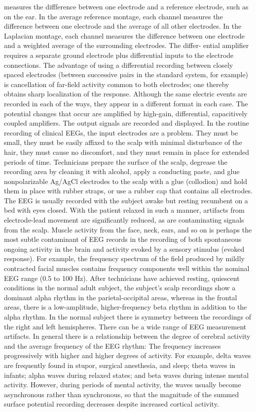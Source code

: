 measures the diffference between one electrode and a reference electrode,
such as on the ear. In the average reference montage, each channel measures
the difference between one electrode and the average of all other electrodes.
In the Laplacian montage, each channel measures the difference between one
electrode and a weighted average of the surrounding electrodes. The differ-
ential amplifier requires a separate ground electrode plus differential inputs to
the electrode connections. The advantage of using a differential recording
between closely spaced electrodes (between successive pairs in the standard
system, for example) is cancellation of far-field activity common to both
electrodes; one thereby obtains sharp localization of the response. Although
the same electric events are recorded in each of the ways, they appear in a
different format in each case. The potential changes that occur are amplified by
high-gain, differential, capacitively coupled amplifiers. The output signals are
recorded and displayed.
In the routine recording of clinical EEGs, the input electrodes are a
problem. They must be small, they must be easily affixed to the scalp with
minimal disturbance of the hair, they must cause no discomfort, and they must
remain in place for extended periods of time. Technicians prepare the surface
of the scalp, degrease the recording area by cleaning it with alcohol, apply a
conducting paste, and glue nonpolarizable Ag/AgCl electrodes to the scalp
with a glue (collodion) and hold them in place with rubber straps, or use a
rubber cap that contains all electrodes.
The EEG is usually recorded with the subject awake but resting recumbent
on a bed with eyes closed. With the patient relaxed in such a manner, artifacts
from electrode-lead movement are significantly reduced, as are contaminating
signals from the scalp. Muscle activity from the face, neck, ears, and so on is
perhaps the most subtle contaminant of EEG records in the recording of both
spontaneous ongoing activity in the brain and activity evoked by a sensory
stimulus (evoked response). For example, the frequency spectrum of the field
produced by mildly contracted facial muscles contains frequency components
well within the nominal EEG range (0.5 to 100 Hz). After technicians have
achieved resting, quiescent conditions in the normal adult subject, the subject’s
scalp recordings show a dominant alpha rhythm in the parietal-occipital areas,
whereas in the frontal areas, there is a low-amplitude, higher-frequency beta
rhythm in addition to the alpha rhythm. In the normal subject there is
symmetry between the recordings of the right and left hemispheres. There
can be a wide range of EEG measurement artifacts.
In general there is a relationship between the degree of cerebral activity
and the average frequency of the EEG rhythm: The frequency increases
progressively with higher and higher degrees of activity. For example, delta
waves are frequently found in stupor, surgical anesthesia, and sleep; theta
waves in infants; alpha waves during relaxed states; and beta waves during
intense mental activity. However, during periods of mental activity, the waves
usually become asynchronous rather than synchronous, so that the magnitude
of the summed surface potential recording decreases despite increased cortical
activity.

